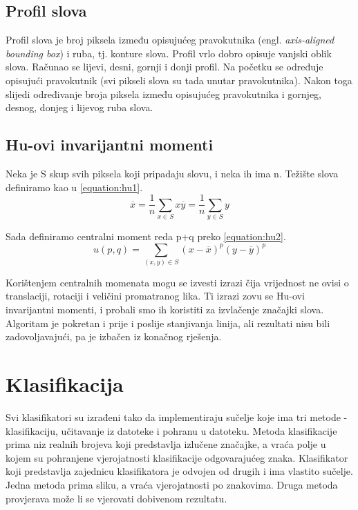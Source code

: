 \documentclass[a4paper,twocolumn,dvipdfm]{article}
\begin{document}
\subsection{Profil slova}
Profil slova je broj piksela između opisujućeg pravokutnika (engl. \emph{axis-aligned bounding box}) i ruba, tj. konture slova. Profil vrlo dobro opisuje vanjski oblik slova. Računao se lijevi, desni, gornji i donji profil. Na početku se određuje opisujući pravokutnik (svi pikseli slova su tada unutar pravokutnika). Nakon toga slijedi određivanje broja piksela između opisujućeg pravokutnika i gornjeg, desnog, donjeg i lijevog ruba slova. 

\subsection{Hu-ovi invarijantni momenti}
Neka je S skup svih piksela koji pripadaju slovu, i neka ih ima n.
Težište slova definiramo kao u \ref{equation:hu1}.
\begin{equation}
\overline{x} = \frac{1}{n}\displaystyle\sum_{x \in S}x
\overline{y} = \frac{1}{n}\displaystyle\sum_{y \in S}y
\label{equation:hu1}
\end{equation}

Sada definiramo centralni moment reda p+q preko \ref{equation:hu2}.
\begin{equation}
u(p,q) = \displaystyle\sum_{(x,y) \in S}(x-\overline{x})^p(y-\overline{y})^p
\label{equation:hu2}
\end{equation}

Korištenjem centralnih momenata mogu se izvesti izrazi čija vrijednost ne ovisi o translaciji, rotaciji i veličini promatranog lika.
Ti izrazi zovu se Hu-ovi invarijantni momenti, i probali smo ih koristiti za izvlačenje značajki slova.
Algoritam je pokretan i prije i poslije stanjivanja linija, ali rezultati nisu bili zadovoljavajući, pa je izbačen iz konačnog rješenja.


\section{Klasifikacija}
Svi klasifikatori su izrađeni tako da implementiraju sučelje koje ima tri metode
- klasifikaciju, učitavanje iz datoteke i pohranu u datoteku. Metoda
klasifikacije prima niz realnih brojeva koji predstavlja izlučene značajke, a
vraća polje u kojem su pohranjene vjerojatnosti klasifikacije odgovarajućeg
znaka. Klasifikator koji predstavlja zajednicu klasifikatora je odvojen od
drugih i ima vlastito sučelje. Jedna metoda prima sliku, a vraća vjerojatnosti
po znakovima. Druga metoda provjerava može li se vjerovati dobivenom rezultatu.
\end{document}
